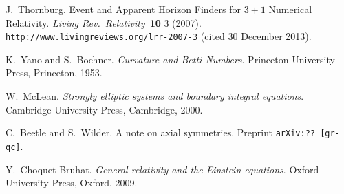 \documentclass[12pt,letterpaper]{iopart}
\begin{document}
\begin{thebibliography}{MM}
J.~Thornburg.
Event and Apparent Horizon Finders for $3 + 1$ Numerical Relativity.
\textit{Living Rev.\ Relativity}\ \textbf{10} 3 (2007).\\
\texttt{http://www.livingreviews.org/lrr-2007-3} (cited 30 December 2013).

K.~Yano and S.~Bochner.
\textit{Curvature and Betti Numbers}.
Princeton University Press, Princeton, 1953.

W.~McLean.
\textit{Strongly elliptic systems and boundary integral equations}.
Cambridge University Press, Cambridge, 2000.

C.~Beetle and S.~Wilder.
A note on axial symmetries.
Preprint \texttt{arXiv:??\ [gr-qc]}.

Y.~Choquet-Bruhat.
\textit{General relativity and the Einstein equations}.
Oxford University Press, Oxford, 2009.

\end{thebibliography}
\end{document}
